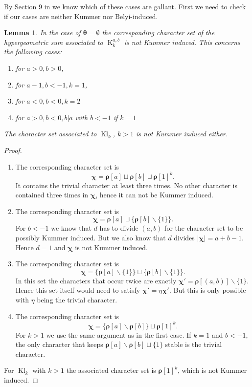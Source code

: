 \documentclass[12pt]{amsart}
\theoremstyle{plain}
\newtheorem{lem}[thm]{Lemma}
\theoremstyle{definition}
\theoremstyle{remark}
\numberwithin{equation}{section}
\DeclareMathOperator{\Kl}{Kl}%
\DeclareMathOperator{\K}{K} %
\begin{document}
By Section 9 in \cite{FKMSbilinear} we know which of these cases are gallant. 
First we need to check if our cases are neither Kummer nor Belyi-induced. 



\begin{lem} In the case of $\bm \theta =\emptyset$ the corresponding character set of the hypergeometric sum associated to $\K_k^{a,b}$ is not Kummer induced. This concerns the following cases: 
 \begin{enumerate}
      \item for $a>0, b>0$, 
      \item for $a-1,b<-1,k=1$,
      \item for $a<0,b<0,k=2$
      \item for $a>0,b<0, b|a$ with $b<-1$ if $k=1$ 
  \end{enumerate} 
The character set associated to $\Kl_k$, $k>1$ is not Kummer induced either. 
\end{lem}
\begin{proof}
\begin{enumerate}
    \item 
   The corresponding character set is $$\bm\chi=\bm \rho[a]\sqcup\bm \rho[b]\sqcup\bm \rho[1]^k.$$ It contains the trivial character at least three times. No other character is contained three times in $\bm \chi$, hence it can not be Kummer induced. 

  \item   The corresponding character set is
    $$\bm\chi=\bm \rho[a]\sqcup\{\bm \rho[b]\smallsetminus\{1\}\}.$$
For $b<-1$ we know that $d$ has to divide $(a,b)$ for the character set to be possibly Kummer induced. But we also know that $d$ divides $|\bm \chi|=a+b-1$. Hence $d=1$ and $\bm\chi$ is not Kummer induced. 

  \item   The corresponding character set is
    $$\bm\chi=\{\bm \rho[a]\smallsetminus\{1\}\}\sqcup\{\bm \rho[b]\smallsetminus\{1\}\}.$$
 In this set the characters that occur twice are exactly $\bm {\chi'}= \bm \rho[(a,b)]\smallsetminus\{1\}$. Hence this set itself would need to satisfy $\bm {\chi'}=\eta \bm {\chi'}$. But this is only possible with $\eta$ being the trivial character. 

  \item   The corresponding character set is 
    $$\bm\chi=\{\bm \rho[a]\smallsetminus\bm \rho[b]\}\sqcup\bm \rho[1]^{k}.$$
   For $k>1$ we use the same argument as in the first case. If $k=1$ and $b<-1$, the only character that keeps $\bm \rho[a]\smallsetminus\bm \rho[b]\sqcup \{1\}$ stable is the trivial character.
\end{enumerate}
   For $\Kl_k$ with $k>1$ the associated character set is $\bm \rho[1]^k$, which is not Kummer induced. 
\end{proof}
\end{document}
